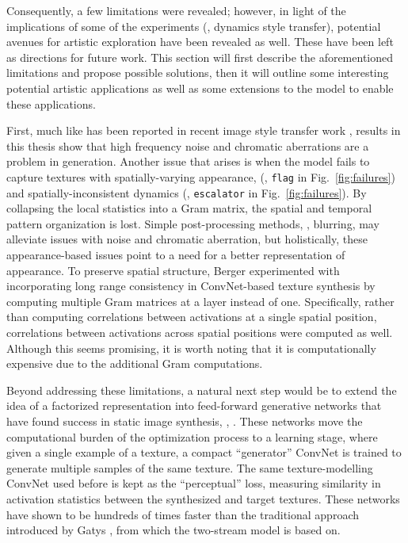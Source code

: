 Consequently, a few limitations were revealed; however, in light of the implications of some of the experiments (\eg, dynamics style transfer), potential avenues for artistic exploration have been revealed as well. These have been left as directions for future work. This section will first describe the aforementioned limitations and propose possible solutions, then it will outline some interesting potential artistic applications as well as some extensions to the model to enable these applications.

First, much like has been reported in recent image style transfer
work \cite{gatys2016image}, results in this thesis show that high frequency
noise and chromatic aberrations are a problem in generation. Another issue that arises is when the model fails to capture
textures with spatially-varying appearance, (\eg, 
\texttt{flag} in Fig.\ \ref{fig:failures}) and
spatially-inconsistent dynamics (\eg, \texttt{escalator} in 
Fig.\ \ref{fig:failures}).
By collapsing the local statistics into a Gram matrix, 
the spatial and temporal pattern organization is lost.
Simple post-processing methods, \eg, blurring, may alleviate issues with noise and chromatic aberration, but holistically, these appearance-based issues point to a need for a better representation of appearance. To preserve spatial structure, Berger \etal \cite{berger2016} experimented with incorporating long range consistency in ConvNet-based texture synthesis by computing multiple Gram matrices at a layer instead of one. Specifically, rather than computing correlations between activations at a single spatial position, correlations between activations across spatial positions were computed as well. Although this seems promising, it is worth noting that it is computationally expensive due to the additional Gram computations.

Beyond addressing these limitations, a natural next step would be
to extend the idea of a factorized representation into feed-forward
generative networks that have found success in static image
synthesis, \eg, \cite{johnson2016,ulyanov2016}. These networks move the computational burden of the optimization process to a learning stage, where given a single example of a texture, a compact ``generator'' ConvNet is trained to generate multiple samples of the same texture. The same texture-modelling ConvNet used before is kept as the ``perceptual'' loss, measuring similarity in activation statistics between the synthesized and target textures. These networks have shown to be hundreds of times faster than the traditional approach introduced by Gatys \etal \cite{gatys2015}, from which the two-stream model is based on.

